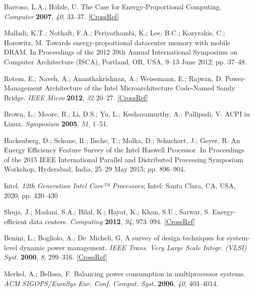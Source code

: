 \begin{thebibliography}{999}
	Barroso, L.A.; H{\"{o}}lzle, U. The Case for Energy-Proportional Computing. {\em Computer} {\bf 2007}, {\em 40}, 33--37. [\href{http://dx.doi.org/10.1109/MC.2007.443}{CrossRef}]
	
	Malladi, K.T.; Nothaft, F.A.; Periyathambi, K.; Lee, B.C.; Kozyrakis, C.; Horowitz, M. Towards energy-proportional datacenter memory with mobile DRAM. {In  Proceedings of the 2012 39th Annual International Symposium on Computer Architecture (ISCA), Portland, OR, USA, 9--13 June 2012}; pp. 37--48.
	
	Rotem, E.; Naveh, A.; Ananthakrishnan, A.; Weissmann, E.; Rajwan, D. Power-Management Architecture of the Intel Microarchitecture Code-Named Sandy Bridge. {\em IEEE Micro} {\bf 2012}, {\em 32} 20--27. [\href{http://dx.doi.org/10.1109/MM.2012.12}{CrossRef}]
	
	Brown, L.; Moore, R.; Li, D.S.; Yu, L.; Keshavamurthy, A.; Pallipadi, V. ACPI in Linux. {\em Symposium } {\bf 2005}, {\em 51}, 1--51.
	
	Hackenberg, D.; Schone, R.; Ilsche, T.; Molka, D.; Schuchart, J.; Geyer, R. An Energy Efficiency Feature Survey of the Intel Haswell Processor. {In  Proceedings of the  2015 IEEE International Parallel and Distributed Processing Symposium Workshop, Hyderabad, India, 25--29 May 2015}; pp. 896--904.
	
	Intel. \textit{12th Generation Intel {\textregistered} Core™ Processors}; Intel: Santa Clara, CA, USA, 2020; pp. 420--430
	
	Shuja, J.; Madani, S.A.; Bilal, K.; Hayat, K.; Khan, S.U.; Sarwar, S. Energy-efficient data centers. {\em Computing} {\bf 2012}, {\em 94}, 973--994. [\href{http://dx.doi.org/10.1007/s00607-012-0211-2}{CrossRef}]
	
	Benini, L.; Bogliolo, A.; De~Micheli, G. A survey of design techniques for system-level dynamic power management. {\em IEEE Trans. Very Large Scale Integr. (VLSI) Syst.} {\bf 2000}, {\em 8}, 299--316. [\href{http://dx.doi.org/10.1109/92.845896}{CrossRef}]
	
	Merkel, A.; Bellosa, F. Balancing power consumption in multiprocessor systems. {\em ACM SIGOPS/EuroSys Eur. Conf. Comput. Syst.} {\bf 2006}, \emph{40}, 403--4014.
	

\end{thebibliography}
